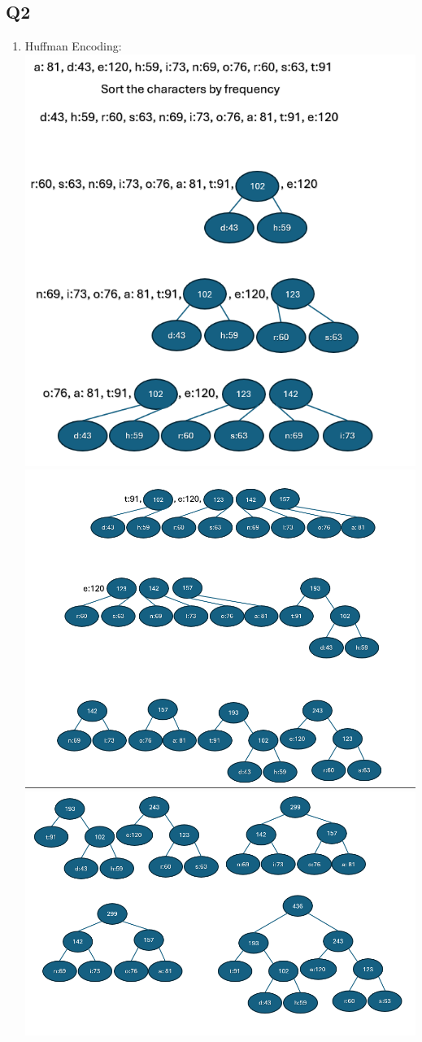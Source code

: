 \documentclass{article}
\begin{document}
\subsection*{Q2}
\begin{enumerate}[label=(\alph*)]
    \item Huffman Encoding:
    \subitem \includegraphics[width=.65\textwidth]{huffman1.png}
    \subitem \includegraphics[width=.65\textwidth]{huffman2.png}
    \subitem \includegraphics[width=1\textwidth]{huffman3.png}

\end{enumerate}
\end{document}

